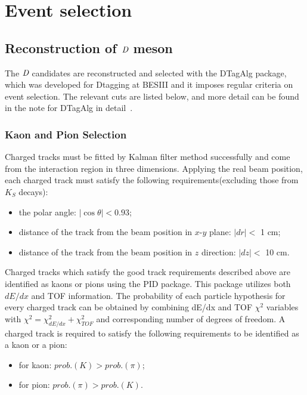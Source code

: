 \documentclass[aps,preprint,tightenlines,superscriptaddress,showpacs,byrevtex,amsmath,amssymb,nofloatfix]{revtex4}
\begin{document}
\section{Event selection}

\subsection{Reconstruction of $\emph{D}$ meson}
The $\emph{D}$ candidates are reconstructed and selected with the DTagAlg package, which was developed for Dtagging at BESIII and it imposes regular criteria on event selection. The relevant cuts are listed below, and more detail can be found in the note for DTagAlg in detail~\cite{DTagAlg}.

\subsubsection{Kaon and Pion Selection}
Charged tracks must be fitted by Kalman filter method successfully and come from the interaction region in three dimensions. Applying the real beam position, each charged track must satisfy the following requirements(excluding those from $K_{S}$ decays):
\begin{itemize}
  \item the polar angle: $|\cos\theta|<0.93$;
  \item distance of the track from the beam position in $x$-$y$ plane: $|dr| <$ 1 cm;
  \item distance of the track from the beam position in $z$ direction: $|dz| <$ 10 cm.
\end{itemize}

Charged tracks which satisfy the good track requirements described above are identified as kaons or pions using the PID package. This package utilizes both $dE/dx$ and TOF information. The probability of each particle hypothesis for every charged track can be obtained by combining dE/dx and TOF $\chi^{2}$ variables with $\chi^{2}=\chi^{2}_{dE/dx}+\chi^{2}_{TOF}$ and corresponding number of degrees of freedom. A charged track is required to satisfy the following requirements to be identified as a kaon or a pion:
\begin{itemize}
  \item for kaon:  $prob.(K)> prob.(\pi)$;
  \item for pion:  $prob.(\pi)> prob.(K)$.
\end{itemize}
\end{document}
